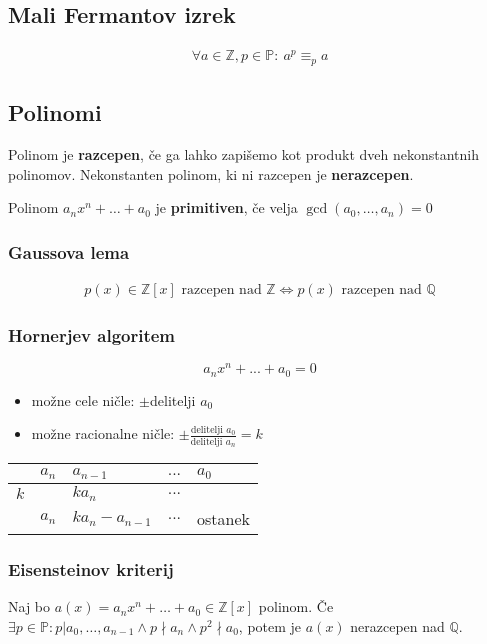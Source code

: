 	\subsection*{Mali Fermantov izrek}
	\begin{align}
		\forall a \in \mathbb{Z}, p \in \mathbb{P}:\ a^p \equiv_p a
	\end{align}

	\subsection*{Polinomi}
	Polinom je \textbf{razcepen}, če ga lahko zapišemo kot produkt dveh nekonstantnih polinomov.
	Nekonstanten polinom, ki ni razcepen je \textbf{nerazcepen}.

	Polinom $a_n x^n + \dots + a_0$ je \textbf{primitiven}, če velja $\gcd(a_0, \dots, a_n) = 0$

	\subsubsection*{Gaussova lema}
	\begin{align}
		p(x) \in \mathbb{Z}[x] \text{ razcepen nad } \mathbb{Z} \iff p(x) \text{ razcepen nad } \mathbb{Q}
	\end{align}

	\subsubsection*{Hornerjev algoritem}
	\[a_n x^n + ... + a_0 = 0\]
	\begin{itemize}
		\item možne cele ničle: $\pm$delitelji $a_0$
		\item možne racionalne ničle: $\pm \frac{\text{delitelji }a_0}{\text{delitelji }a_n} = k$
	\end{itemize}
	\begin{center}
		\begin{tabular}{ l|l l l l}
				& $a_n$ & $a_{n-1}$ & $...$ & $a_0$ \\ \hline
			$k$ &       & $ka_n$    & $...$ & \\ \hline
				& $a_n$ & $ka_n - a_{n-1}$ & $...$ & ostanek\\
		\end{tabular}
	\end{center}

	\subsubsection*{Eisensteinov kriterij}
	Naj bo $a(x) = a_n x^n + \dots + a_0 \in \mathbb{Z}[x]$ polinom. Če $\exists p \in \mathbb{P} : p | a_0, \dots, a_{n-1} \wedge p \nmid a_n \wedge p^2 \nmid a_0$, potem je $a(x)$ nerazcepen nad $\mathbb{Q}$.

